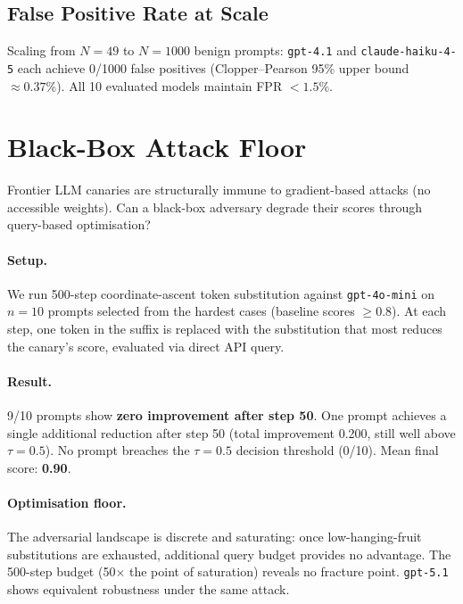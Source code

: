 \documentclass{article}
\begin{document}
\subsection{False Positive Rate at Scale}

Scaling from $N{=}49$ to $N{=}1000$ benign prompts: \texttt{gpt-4.1} and \texttt{claude-haiku-4-5} each achieve 0/1000 false positives (Clopper--Pearson 95\% upper bound $\approx 0.37\%$). All 10 evaluated models maintain FPR $< 1.5\%$.


\section{Black-Box Attack Floor}
\label{sec:blackbox}

Frontier LLM canaries are structurally immune to gradient-based attacks (no accessible weights). Can a black-box adversary degrade their scores through query-based optimisation?

\paragraph{Setup.} We run 500-step coordinate-ascent token substitution against \texttt{gpt-4o-mini} on $n{=}10$ prompts selected from the hardest cases (baseline scores $\geq 0.8$). At each step, one token in the suffix is replaced with the substitution that most reduces the canary's score, evaluated via direct API query.

\paragraph{Result.} 9/10 prompts show \textbf{zero improvement after step 50}. One prompt achieves a single additional reduction after step 50 (total improvement 0.200, still well above $\tau = 0.5$). No prompt breaches the $\tau = 0.5$ decision threshold (0/10). Mean final score: \textbf{0.90}.

\paragraph{Optimisation floor.} The adversarial landscape is discrete and saturating: once low-hanging-fruit substitutions are exhausted, additional query budget provides no advantage. The 500-step budget (50$\times$ the point of saturation) reveals no fracture point. \texttt{gpt-5.1} shows equivalent robustness under the same attack.
\end{document}
